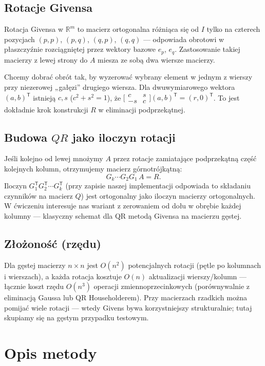 \documentclass[polish]{template/projectreport}
\begin{document}
\subsection{Rotacje Givensa}
Rotacja Givensa w $\mathbb{R}^m$ to macierz ortogonalna różniąca się od $I$ tylko na czterech pozycjach
$(p,p)$, $(p,q)$, $(q,p)$, $(q,q)$ --- odpowiada obrotowi w płaszczyźnie rozciągniętej przez wektory bazowe $e_p$, $e_q$.
Zastosowanie takiej macierzy z lewej strony do $A$ miesza ze sobą dwa wiersze macierzy.

Chcemy dobrać obrót tak, by wyzerować wybrany element w jednym z wierszy przy niezerowej „gałęzi'' drugiego wiersza.
Dla dwuwymiarowego wektora $(a,b)^{\mathsf{T}}$ istnieją $c,s$ ($c^2+s^2=1$), że
$\bigl[\begin{smallmatrix}c&s\\-s&c\end{smallmatrix}\bigr](a,b)^{\mathsf{T}}=(r,0)^{\mathsf{T}}$.
To jest dokładnie krok konstrukcji $R$ w eliminacji podprzekątnej.

\subsection{Budowa $QR$ jako iloczyn rotacji}
Jeśli kolejno od lewej mnożymy $A$ przez rotacje zamiatające podprzekątną część kolejnych kolumn, otrzymujemy
macierz górnotrójkątną:
\[
  G_k \cdots G_2 G_1\, A = R.
\]
Iloczyn $G_1^{\mathsf{T}}G_2^{\mathsf{T}}\cdots G_k^{\mathsf{T}}$ (przy zapisie naszej implementacji odpowiada to
składaniu czynników na macierz $Q$) jest ortogonalny jako iloczyn macierzy ortogonalnych. W ćwiczeniu interesuje nas
wariant z zerowaniem od dołu w obrębie każdej kolumny --- klasyczny schemat dla QR metodą Givensa na macierzu gęstej.

\subsection{Złożoność (rzędu)}
Dla gęstej macierzy $n\times n$ jest $O(n^2)$ potencjalnych rotacji (pętle po kolumnach i wierszach), a każda rotacja
kosztuje $O(n)$ aktualizacji wierszy/kolumn --- łącznie koszt rzędu $O(n^3)$ operacji zmiennoprzecinkowych (porównywalnie
z eliminacją Gaussa lub QR Householderem). Przy macierzach rzadkich można pomijać wiele rotacji --- wtedy Givens bywa
korzystniejszy strukturalnie; tutaj skupiamy się na gęstym przypadku testowym.

\section{Opis metody}
\end{document}
